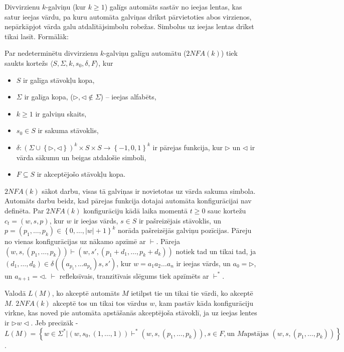 \documentclass{ludis}
\begin{document}
Divvirzienu $k$-galviņu (kur $k\geq 1$) galīgs automāts sastāv no ieejas lentas, kas satur ieejas vārdu, pa kuru automāta galviņas drīkst pārvietoties abos virzienos, nepārkāpjot vārda galu atdalītājsimbolu  robežas. Simbolus uz ieejas lentas drīkst tikai lasīt. Formālāk:
\begin{definicija}
Par nedeterminētu divvirzienu $k$-galviņu galīgu automātu ($2NFA(k)$) tiek saukts kortežs $\langle S, \Sigma, k, s_0, \delta, F \rangle$, kur
\begin{itemize}
	\item $S$ ir galīga stāvokļu kopa,
	\item $\Sigma$ ir galīga kopa, ($ \triangleright,\triangleleft \notin \Sigma$) -- ieejas alfabēts,
	\item $k\geq 1$ ir galviņu skaits, 
	\item $s_0\in S$ ir sakuma stāvoklis,
	\item $\delta: \left( \Sigma \cup \left\{ \triangleright, \triangleleft \right\} \right)^k \times S \times S \rightarrow \left\{-1,0,1\right\}^k$ ir pārejas funkcija, kur $\triangleright$ un $\triangleleft$ ir vārda sākumu un beigas atdalošie simboli,
	\item $F \subseteq S$ ir akceptējošo stāvokļu kopa.
\end{itemize}
\end{definicija}
$2NFA(k)$ sākot darbu, visas tā galviņas ir novietotas uz vārda sakuma simbola. Automāts darbu beidz, kad pārejas funkcija dotajai automāta konfigurācijai nav definēta. Par $2NFA(k)$ konfigurāciju kādā laika momentā $t\geq 0$ sauc kortežu $c_t=\left(w,s,p\right)$, kur $w$ ir ieejas vārds, $s\in S$ ir pašreizējais stāvoklis, un
$p = \left( p_1, \ldots, p_k \right) \in \left\{ 0, \ldots, |w| +1 \right\}^k $
norāda pašreizējās galviņu pozīcijas. Pāreju no vienas konfigurācijas uz nākamo apzīmē ar $\vdash$. Pāreja
$\left( w, s, \left( p_1, \ldots, p_k \right) \right) \vdash \left( w, s', \left( p_1+d_1, \ldots, p_k+d_k \right) \right)$
notiek tad un tikai tad, ja
$\left(d_1, \ldots, d_k \right) \in \delta \left( \left( a_{p_1}, \ldots a_{p_k} \right) s, s' \right)$,
kur $w = a_1a_2 \ldots a_n$ ir ieejas vārds, un $a_0=\triangleright$, un $a_{n+1}=\triangleleft$. $\vdash$ refleksīvais, tranzitīvais slēgums tiek apzīmēts ar $\vdash^*$.

Valodā $L(M)$, ko akceptē automāts $M$ ietilpst tie un tikai tie vārdi, ko akceptē $M$. $2NFA(k)$ akceptē tos un tikai tos vārdus $w$, kam pastāv kāda konfigurāciju virkne, kas noved pie automāta apstāšanās akceptējoša stāvoklī, ja uz ieejas lentes ir
$\triangleright w \triangleleft$. Jeb precīzāk - $L(M)=\left\{ w \in \Sigma^* | \left(w,s_0,\left(1,\ldots,1\right)\right) \vdash^* \left(w,s,\left(p_1,\ldots,p_k\right)\right), s \in F, \textrm{un } M \textrm{apstājas } \left(w,s,\left(p_1,\ldots,p_k\right)\right)\right\}$. %
\end{document}
